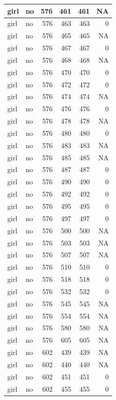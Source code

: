 \documentclass[man]{apa6}
\begin{document}
\begin{tabular}{l|l|r|r|r|r}
\hline
girl & no & 576 & 461 & 461 & NA\\
\hline
girl & no & 576 & 463 & 463 & 0\\
\hline
girl & no & 576 & 465 & 465 & NA\\
\hline
girl & no & 576 & 467 & 467 & 0\\
\hline
girl & no & 576 & 468 & 468 & NA\\
\hline
girl & no & 576 & 470 & 470 & 0\\
\hline
girl & no & 576 & 472 & 472 & 0\\
\hline
girl & no & 576 & 474 & 474 & NA\\
\hline
girl & no & 576 & 476 & 476 & 0\\
\hline
girl & no & 576 & 478 & 478 & NA\\
\hline
girl & no & 576 & 480 & 480 & 0\\
\hline
girl & no & 576 & 483 & 483 & NA\\
\hline
girl & no & 576 & 485 & 485 & NA\\
\hline
girl & no & 576 & 487 & 487 & 0\\
\hline
girl & no & 576 & 490 & 490 & 0\\
\hline
girl & no & 576 & 492 & 492 & 0\\
\hline
girl & no & 576 & 495 & 495 & 0\\
\hline
girl & no & 576 & 497 & 497 & 0\\
\hline
girl & no & 576 & 500 & 500 & NA\\
\hline
girl & no & 576 & 503 & 503 & NA\\
\hline
girl & no & 576 & 507 & 507 & NA\\
\hline
girl & no & 576 & 510 & 510 & 0\\
\hline
girl & no & 576 & 518 & 518 & 0\\
\hline
girl & no & 576 & 532 & 532 & 0\\
\hline
girl & no & 576 & 545 & 545 & NA\\
\hline
girl & no & 576 & 554 & 554 & NA\\
\hline
girl & no & 576 & 580 & 580 & NA\\
\hline
girl & no & 576 & 605 & 605 & NA\\
\hline
girl & no & 602 & 439 & 439 & NA\\
\hline
girl & no & 602 & 440 & 440 & NA\\
\hline
girl & no & 602 & 451 & 451 & 0\\
\hline
girl & no & 602 & 455 & 455 & 0\\

\end{tabular}
\end{document}
